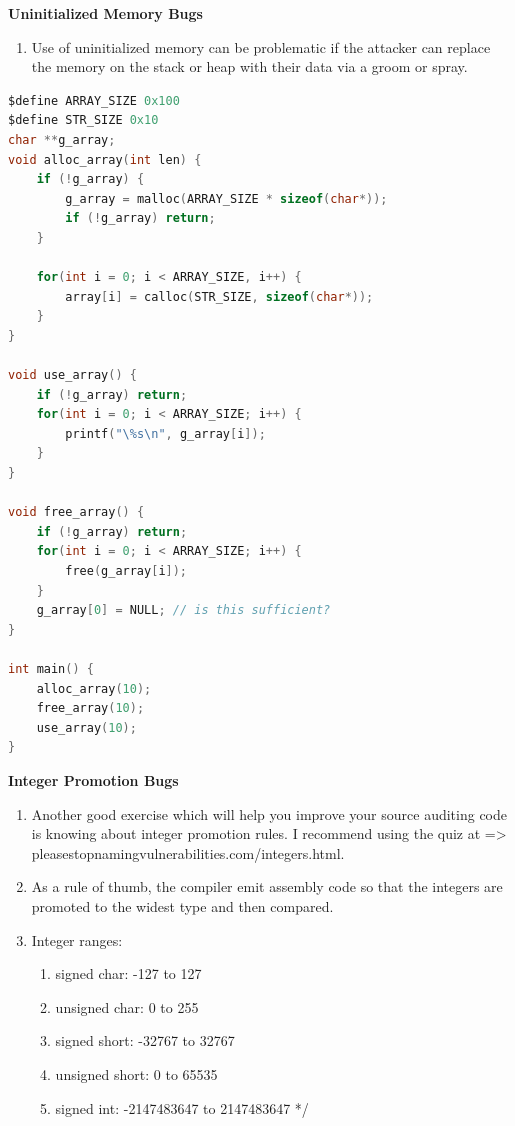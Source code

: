 \documentclass[12pt]{Training}
\begin{document}
\textbf{Uninitialized Memory Bugs}
\begin{enumerate}
    \item Use of uninitialized memory can be problematic if the attacker can replace the memory on the stack or heap with their data via a groom or spray.
\end{enumerate}
\begin{sectionbox}
\begin{lstlisting}[language=C, caption={Memory Used Unintialized}]
$define ARRAY_SIZE 0x100
$define STR_SIZE 0x10
char **g_array;
void alloc_array(int len) {
    if (!g_array) {
        g_array = malloc(ARRAY_SIZE * sizeof(char*));
        if (!g_array) return;
    }

    for(int i = 0; i < ARRAY_SIZE, i++) {
        array[i] = calloc(STR_SIZE, sizeof(char*));
    }
}

void use_array() {
    if (!g_array) return;
    for(int i = 0; i < ARRAY_SIZE; i++) {
        printf("\%s\n", g_array[i]);
    }
}

void free_array() {
    if (!g_array) return;
    for(int i = 0; i < ARRAY_SIZE; i++) {
        free(g_array[i]);
    }
    g_array[0] = NULL; // is this sufficient?
}

int main() {
    alloc_array(10);
    free_array(10);
    use_array(10);
}
\end{lstlisting}
\end{sectionbox}


\textbf{Integer Promotion Bugs}
\begin{enumerate}
    \item Another good exercise which will help you improve your source auditing code is knowing about integer promotion rules. I recommend using the quiz at => pleasestopnamingvulnerabilities.com/integers.html.
    \item As a rule of thumb, the compiler emit assembly code so that the integers are promoted to the widest type and then compared.
    \item Integer ranges:
        \begin{enumerate}
            \item signed char: -127 to 127
            \item unsigned char: 0 to 255
            \item signed short: -32767 to 32767
            \item unsigned short: 0 to 65535
            \item signed int: -2147483647 to 2147483647 */
        \end{enumerate}
\end{enumerate}
\end{document}
